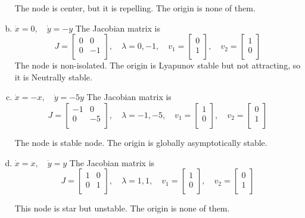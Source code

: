 \documentclass[12pt]{exam}
\begin{document}
\begin{enumerate}[(a)]
	The node is center, but it is repelling. The origin is none of them.

    \item $\dot{x} = 0, \quad \dot{y} = -y$
	    The Jacobian matrix is
	    \[ J = \begin{bmatrix}
	        0 & 0 \\
	        0 & -1 \\
		\end{bmatrix} , \quad \lambda = 0, -1 , \quad v_1= \begin{bmatrix}
		0 \\
		1 \\
		\end{bmatrix} , \quad v_2 = \begin{bmatrix}
		1 \\
		0 \\
	\end{bmatrix} \]
	The node is non-isolated. The origin is Lyapunov stable but not attracting, so it is Neutrally stable.

     \item $ \dot{x} = -x, \quad \dot{y} = -5y$
	    The Jacobian matrix is
	    \[ J = \begin{bmatrix}
	        -1 & 0 \\
	        0 & -5 \\
		\end{bmatrix} , \quad \lambda = -1, -5 , \quad v_1= \begin{bmatrix}
		1 \\
		0 \\
		\end{bmatrix} , \quad v_2 = \begin{bmatrix}
		0 \\
		1 \\
	\end{bmatrix} \]
	
	The node is stable node. The origin is globally asymptotically stable.

    \item $\dot{x} = x, \quad \dot{y} = y$
	    The Jacobian matrix is
	    \[ J = \begin{bmatrix}
	        1 & 0 \\
	        0 & 1 \\
		\end{bmatrix} , \quad \lambda = 1, 1 , \quad v_1= \begin{bmatrix}
		1 \\
		0 \\
		\end{bmatrix} , \quad v_2 = \begin{bmatrix}
		0 \\
		1 \\
	\end{bmatrix} \]

	This node is star but unstable. The origin is none of them.

\end{enumerate}
\end{document}
